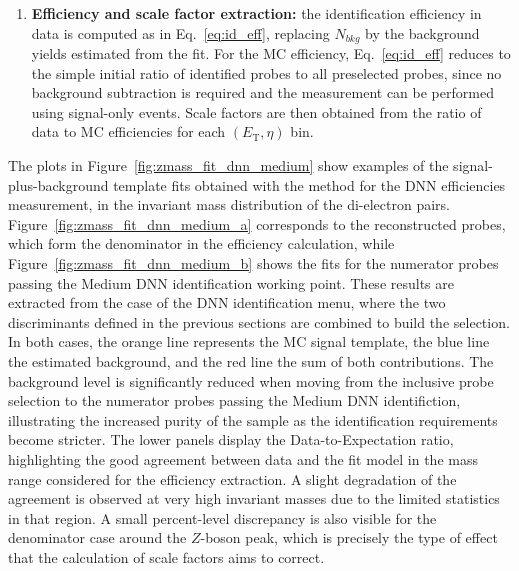 \begin{enumerate}
    \item \textbf{Efficiency and scale factor extraction:} the identification efficiency in data is computed as in Eq.~\ref{eq:id_eff}, replacing $N_{bkg}$ by the background yields estimated from the fit. For the MC efficiency, Eq.~\ref{eq:id_eff} reduces to the simple initial ratio of identified probes to all preselected probes, since no background subtraction is required and the measurement can be performed using signal-only events. Scale factors are then obtained from the ratio of data to MC efficiencies for each $(E_{\mathrm{T}},\eta)$ bin.
\end{enumerate}

The plots in Figure~\ref{fig:zmass_fit_dnn_medium} show examples of the signal-plus-background template fits obtained with the \zmass method for the DNN efficiencies measurement, in the invariant mass distribution of the di-electron pairs. Figure~\ref{fig:zmass_fit_dnn_medium_a} corresponds to the reconstructed probes, which form the denominator in the efficiency calculation, while Figure~\ref{fig:zmass_fit_dnn_medium_b} shows the fits for the numerator probes passing the Medium DNN identification working point. These results are extracted from the case of the DNN identification menu, where the two discriminants defined in the previous sections are combined to build the selection. 
In both cases, the orange line represents the MC signal template, the blue line the estimated background, and the red line the sum of both contributions. The background level is significantly reduced when moving from the inclusive probe selection to the numerator probes passing the Medium DNN identifiction, illustrating the increased purity of the sample as the identification requirements become stricter. 
The lower panels display the Data-to-Expectation ratio, highlighting the good agreement between data and the fit model in the mass range considered for the efficiency extraction. A slight degradation of the agreement is observed at very high invariant masses due to the limited statistics in that region. A small percent-level discrepancy is also visible for the denominator case around the $Z$-boson peak, which is precisely the type of effect that the calculation of scale factors aims to correct.

